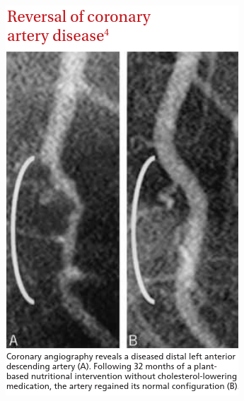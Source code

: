 \begin{figure}[htpb]
    \centering
    \includegraphics[width=0.8\linewidth]{media/Screenshot_2020-01-07_JFP_06307_Article1 pdf.png}
    \caption{\cite{esselstyn2014way}}%
    \label{fig:reverseCAD}
\end{figure}
